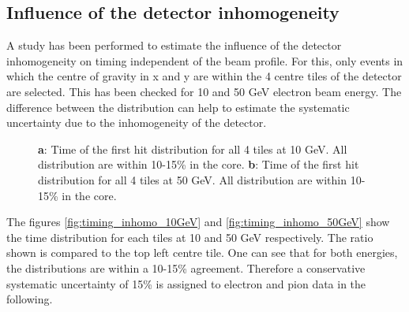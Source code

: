 \documentclass[twoside,a4paper,11pt]{article}
\begin{document}
\subsection{Influence of the detector inhomogeneity}
\label{subsec:det_inhomo}

A study has been performed to estimate the influence of the detector inhomogeneity on timing independent of the beam profile. For this, only events in which the centre of gravity in x and y are within the 4 centre tiles of the detector are selected. This has been checked for 10 and 50 GeV electron beam energy. The difference between the distribution can help to estimate the systematic uncertainty due to the inhomogeneity of the detector. 
\begin{figure}[htbp]
	\hfill
	\caption[]{\textbf{a}: Time of the first hit distribution for all 4 tiles at 10 GeV. All distribution are within 10-15\% in the core. \textbf{b}: Time of the first hit distribution for all 4 tiles at 50 GeV. All distribution are within 10-15\% in the core.}
\end{figure}
The figures \ref{fig:timing_inhomo_10GeV} and \ref{fig:timing_inhomo_50GeV} show the time distribution for each tiles at 10 and 50 GeV respectively. The ratio shown is compared to the top left centre tile. One can see that for both energies, the distributions are within a 10-15\% agreement. Therefore a conservative systematic uncertainty of 15\% is assigned to electron and pion data in the following.
\end{document}
